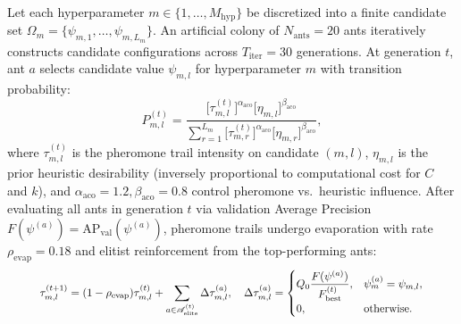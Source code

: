 \documentclass[10pt,a4paper,twocolumn]{article}
\begin{document}
Let each hyperparameter $m \in \{1, \dots, M_{\text{hyp}}\}$ be discretized into a finite candidate set $\Omega_m = \{\psi_{m,1}, \dots, \psi_{m,L_m}\}$. An artificial colony of $N_{\text{ants}} = 20$ ants iteratively constructs candidate configurations across $T_{\text{iter}} = 30$ generations. At generation $t$, ant $a$ selects candidate value $\psi_{m,l}$ for hyperparameter $m$ with transition probability:
\begin{equation}
  P_{m,l}^{(t)} = \frac{\big[\tau_{m,l}^{(t)}\big]^{\alpha_{\text{aco}}} \big[\eta_{m,l}\big]^{\beta_{\text{aco}}}}{\sum_{r=1}^{L_m} \big[\tau_{m,r}^{(t)}\big]^{\alpha_{\text{aco}}} \big[\eta_{m,r}\big]^{\beta_{\text{aco}}}},
\end{equation}
where $\tau_{m,l}^{(t)}$ is the pheromone trail intensity on candidate $(m, l)$, $\eta_{m,l}$ is the prior heuristic desirability (inversely proportional to computational cost for $C$ and $k$), and $\alpha_{\text{aco}} = 1.2, \beta_{\text{aco}} = 0.8$ control pheromone vs.\ heuristic influence. After evaluating all ants in generation $t$ via validation Average Precision $F(\psi^{(a)}) = \text{AP}_{\text{val}}(\psi^{(a)})$, pheromone trails undergo evaporation with rate $\rho_{\text{evap}} = 0.18$ and elitist reinforcement from the top-performing ants:
\begin{equation}
  \resizebox{0.89\linewidth}{!}{$\displaystyle \tau_{m,l}^{(t+1)} = (1 - \rho_{\text{evap}})\tau_{m,l}^{(t)} + \sum_{a \in \mathscr{A}_{\text{elite}}^{(t)}} \Delta \tau_{m,l}^{(a)}, \quad \Delta \tau_{m,l}^{(a)} = \begin{cases}
    Q_0 \dfrac{F(\psi^{(a)})}{F_{\text{best}}^{(t)}}, & \psi_m^{(a)} = \psi_{m,l}, \\[4pt]
    0, & \text{otherwise}.
  \end{cases}$}
\end{equation}
\end{document}
